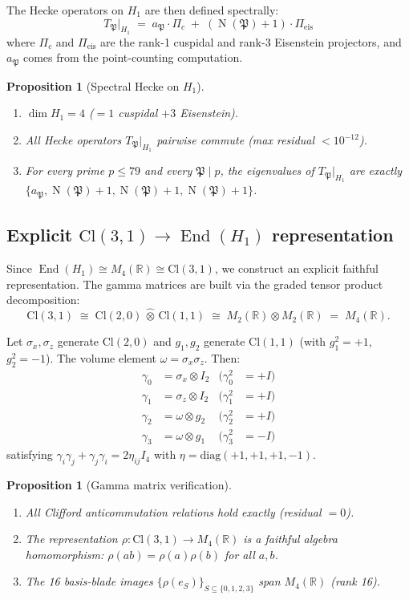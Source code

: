 \documentclass[11pt,a4paper]{article}
\theoremstyle{plain}
\newtheorem{proposition}[theorem]{Proposition}
\theoremstyle{definition}
\theoremstyle{remark}
\numberwithin{equation}{section}
\providecommand{\Cl}{\mathrm{Cl}}
\providecommand{\RR}{\mathbb{R}}
\providecommand{\fP}{\mathfrak{P}}
\DeclareMathOperator{\End}{End}
\DeclareMathOperator{\Nm}{N}
\begin{document}
The Hecke operators on $H_1$ are then defined spectrally:
\[
  T_\fP\big|_{H_1} \;=\; a_\fP \cdot \Pi_c \;+\; (\Nm(\fP)+1)\cdot\Pi_{\mathrm{eis}}
\]
where $\Pi_c$ and $\Pi_{\mathrm{eis}}$ are the rank-1 cuspidal and rank-3
Eisenstein projectors, and $a_\fP$ comes from the point-counting computation.

\begin{proposition}[Spectral Hecke on $H_1$]\label{prop:spectral-hecke}
\begin{enumerate}[label=(\roman*)]
\item $\dim H_1 = 4$ ($= 1$ cuspidal $+ 3$ Eisenstein).
\item All Hecke operators $T_\fP|_{H_1}$ pairwise commute (max residual $< 10^{-12}$).
\item For every prime $p \leq 79$ and every $\fP \mid p$, the eigenvalues of
  $T_\fP|_{H_1}$ are exactly $\{a_\fP, \Nm(\fP)+1, \Nm(\fP)+1, \Nm(\fP)+1\}$.
\end{enumerate}
\end{proposition}

\subsection{Explicit \texorpdfstring{$\Cl(3,1) \to \End(H_1)$}{Cl(3,1) -> End(H1)} representation}

Since $\End(H_1) \cong M_4(\RR) \cong \Cl(3,1)$, we construct an explicit
faithful representation.  The gamma matrices are built via the graded tensor
product decomposition:
\[
  \Cl(3,1) \;\cong\; \Cl(2,0) \,\hat\otimes\, \Cl(1,1)
  \;\cong\; M_2(\RR) \otimes M_2(\RR) \;=\; M_4(\RR).
\]

Let $\sigma_x, \sigma_z$ generate $\Cl(2,0)$ and $g_1, g_2$ generate $\Cl(1,1)$
(with $g_1^2 = +1$, $g_2^2 = -1$).  The volume element
$\omega = \sigma_x\sigma_z$.  Then:
\begin{align*}
  \gamma_0 &= \sigma_x \otimes I_2  &  (\gamma_0^2 &= +I) \\
  \gamma_1 &= \sigma_z \otimes I_2  &  (\gamma_1^2 &= +I) \\
  \gamma_2 &= \omega \otimes g_2    &  (\gamma_2^2 &= +I) \\
  \gamma_3 &= \omega \otimes g_1    &  (\gamma_3^2 &= -I)
\end{align*}
satisfying $\gamma_i\gamma_j + \gamma_j\gamma_i = 2\eta_{ij}I_4$ with
$\eta = \mathrm{diag}(+1,+1,+1,-1)$.

\begin{proposition}[Gamma matrix verification]\label{prop:gammas}
\begin{enumerate}[label=(\roman*)]
\item All Clifford anticommutation relations hold exactly (residual $= 0$).
\item The representation $\rho: \Cl(3,1) \to M_4(\RR)$ is a faithful algebra
  homomorphism: $\rho(ab) = \rho(a)\rho(b)$ for all $a,b$.
\item The 16 basis-blade images $\{\rho(e_S)\}_{S \subseteq \{0,1,2,3\}}$
  span $M_4(\RR)$ (rank 16).
\end{enumerate}
\end{proposition}
\end{document}
